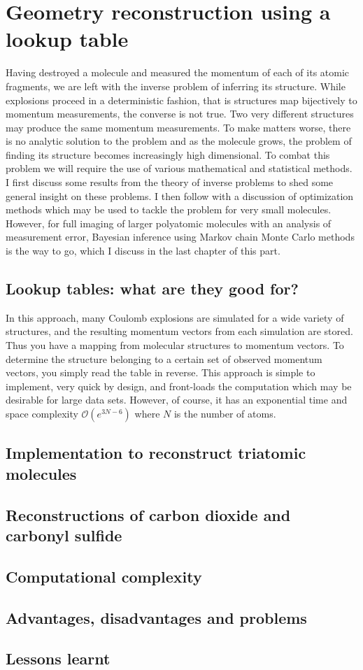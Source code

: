 \chapter{Geometry reconstruction using a lookup table}\label{ch:lookupTable}

Having destroyed a molecule and measured the momentum of each of its atomic fragments, we are left with the inverse problem of inferring its structure. While explosions proceed in a deterministic fashion, that is structures map bijectively to momentum measurements, the converse is not true. Two very different structures may produce the same momentum measurements. To make matters worse, there is no analytic solution to the problem and as the molecule grows, the problem of finding its structure becomes increasingly high dimensional. To combat this problem we will require the use of various mathematical and statistical methods. I first discuss some results from the theory of inverse problems to shed some general insight on these problems. I then follow with a discussion of optimization methods which may be used to tackle the problem for very small molecules. However, for full imaging of larger polyatomic molecules with an analysis of measurement error, Bayesian inference using Markov chain Monte Carlo methods is the way to go, which I discuss in the last chapter of this part.

\section{Lookup tables: what are they good for?}
In this approach, many Coulomb explosions are simulated for a wide variety of structures, and the resulting momentum vectors from each simulation are stored. Thus you have a mapping from molecular structures to momentum vectors. To determine the structure belonging to a certain set of observed momentum vectors, you simply read the table in reverse. This approach is simple to implement, very quick by design, and front-loads the computation which may be desirable for large data sets. However, of course, it has an exponential time and space complexity $\mathcal{O}(e^{3N-6})$ where $N$ is the number of atoms.

\section{Implementation to reconstruct triatomic molecules}

\section{Reconstructions of carbon dioxide and carbonyl sulfide}

\section{Computational complexity}

\section{Advantages, disadvantages and problems}

\section{Lessons learnt}